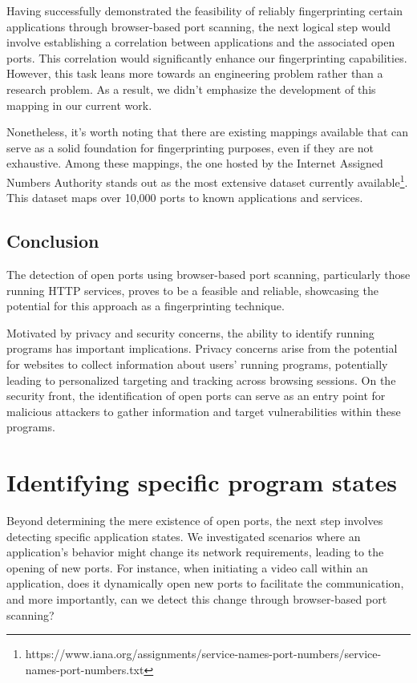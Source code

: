 Having successfully demonstrated the feasibility of reliably fingerprinting certain applications through browser-based port scanning, the next logical step would involve establishing a correlation between applications and the associated open ports. This correlation would significantly enhance our fingerprinting capabilities. However, this task leans more towards an engineering problem rather than a research problem. As a result, we didn't emphasize the development of this mapping in our current work.

Nonetheless, it's worth noting that there are existing mappings available that can serve as a solid foundation for fingerprinting purposes, even if they are not exhaustive. Among these mappings, the one hosted by the Internet Assigned Numbers Authority stands out as the most extensive dataset currently available\footnote{https://www.iana.org/assignments/service-names-port-numbers/service-names-port-numbers.txt}. This dataset maps over 10,000 ports to known applications and services.

\subsection{Conclusion}

The detection of open ports using browser-based port scanning, particularly those running HTTP services, proves to be a feasible and reliable, showcasing the potential for this approach as a fingerprinting technique. 

Motivated by privacy and security concerns, the ability to identify running programs has important implications. Privacy concerns arise from the potential for websites to collect information about users' running programs, potentially leading to personalized targeting and tracking across browsing sessions. On the security front, the identification of open ports can serve as an entry point for malicious attackers to gather information and target vulnerabilities within these programs. 

\section{Identifying specific program states}

Beyond determining the mere existence of open ports, the next step involves detecting specific application states. We investigated scenarios where an application's behavior might change its network requirements, leading to the opening of new ports. For instance, when initiating a video call within an application, does it dynamically open new ports to facilitate the communication, and more importantly, can we detect this change through browser-based port scanning? 

